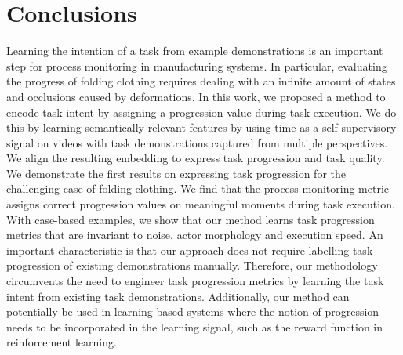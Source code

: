 \section{Conclusions} \label{sec:conclusion}
Learning the intention of a task from example demonstrations is an important step for process monitoring in manufacturing systems. In particular, evaluating the progress of folding clothing requires dealing with an infinite amount of states and occlusions caused by deformations.
In this work, we proposed a method to encode task intent by assigning a progression value during task execution. We do this by learning semantically relevant features by using time as a self-supervisory signal on videos with task demonstrations captured from multiple perspectives. We align the resulting embedding to express task progression and task quality. We demonstrate the first results on expressing task progression for the challenging case of folding clothing. We find that the process monitoring metric assigns correct progression values on meaningful moments during task execution. With case-based examples, we show that our method learns task progression metrics that are invariant to noise, actor morphology and execution speed. An important characteristic is that our approach does not require labelling task progression of existing demonstrations manually. Therefore, our methodology circumvents the need to engineer task progression metrics by learning the task intent from existing task demonstrations. Additionally, our method can potentially be used in learning-based systems where the notion of progression needs to be incorporated in the learning signal, such as the reward function in reinforcement learning.



